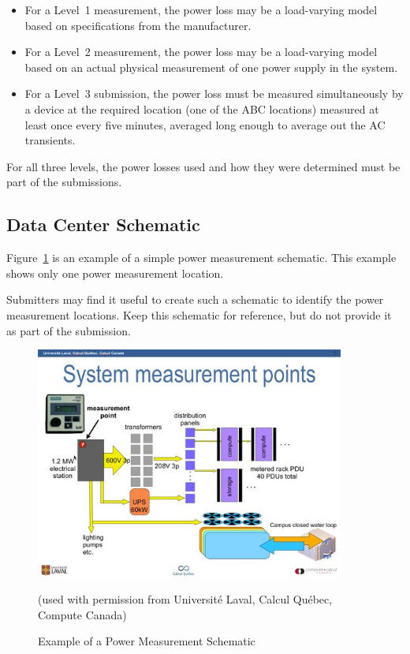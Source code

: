 \begin{itemize}
\item
For a Level~1 measurement, the power loss may be a load-varying model based on specifications from the manufacturer.
\item
For a Level~2 measurement, the power loss may be a load-varying model based on an actual physical measurement of one power supply in the system.
\item
For a Level~3 submission, the power loss must be measured simultaneously by a device at the required location (one of the ABC locations) measured at least once every five minutes, averaged long enough to average out the AC transients.
\end{itemize}

\noindent
For all three levels, the power losses used and how they were determined must be part of the submissions.

\subsection{Data Center Schematic}
\noindent
Figure~\ref{fig:powmeasschem} is an example of a simple power measurement schematic.
This example shows only one power measurement location.
\wl


\noindent
Submitters may find it useful to create such a schematic to identify the power measurement locations.
Keep this schematic for reference, but do not provide it as part of the submission.

\begin{figure}
\centering
\includegraphics[width=4in]{fig3-7}
\caption{Example of a Power Measurement Schematic}
(used with permission from Universit\'{e} Laval, Calcul Qu\'{e}bec, Compute Canada)
\label{fig:powmeasschem}
\end{figure}


